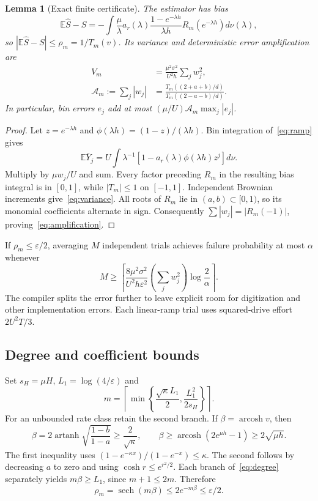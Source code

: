 \documentclass[11pt,a4paper]{article}
\newtheorem{lemma}{Lemma}
\newcommand{\E}{\mathbb E}
\begin{document}
\begin{lemma}[Exact finite certificate]\label{lem:certificate}
The estimator has bias
\begin{equation}\label{eq:bias}
\E\widehat S-S
=-\int\frac{\mu}{\lambda}a_r(\lambda)
\frac{1-e^{-\lambda h}}{\lambda h}
R_m(e^{-\lambda h})d\nu(\lambda),
\end{equation}
so $|\E\widehat S-S|\leq\rho_m=1/T_m(v)$. Its variance and deterministic error amplification are
\begin{align}
V_m&=\frac{\mu^2\sigma^2}{U^2h}\sum_jw_j^2,\label{eq:variance}\\
\mathcal A_m:=\sum_j|w_j|
&=\frac{T_m((2+a+b)/d)}{T_m((2-a-b)/d)}.\label{eq:amplification}
\end{align}
In particular, bin errors $e_j$ add at most $(\mu/U)\mathcal A_m\max_j|e_j|$.
\end{lemma}
\begin{proof}
Let $z=e^{-\lambda h}$ and $\phi(\lambda h)=(1-z)/(\lambda h)$. Bin integration of~\eqref{eq:ramp} gives
\[
\E\bar Y_j=U\int\lambda^{-1}[1-a_r(\lambda)\phi(\lambda h)z^j]d\nu.
\]
Multiply by $\mu w_j/U$ and sum. Every factor preceding $R_m$ in the resulting bias integral is in $[0,1]$, while $|T_m|\leq1$ on $[-1,1]$. Independent Brownian increments give~\eqref{eq:variance}. All roots of $R_m$ lie in $(a,b)\subset[0,1)$, so its monomial coefficients alternate in sign. Consequently $\sum|w_j|=|R_m(-1)|$, proving~\eqref{eq:amplification}.
\end{proof}

If $\rho_m\leq\varepsilon/2$, averaging $M$ independent trials achieves failure probability at most $\alpha$ whenever
\begin{equation}\label{eq:repetitions}
M\geq\left\lceil\frac{8\mu^2\sigma^2}{U^2h\varepsilon^2}
\left(\sum_jw_j^2\right)\log\frac2\alpha\right\rceil.
\end{equation}
The compiler splits the error further to leave explicit room for digitization and other implementation errors. Each linear-ramp trial uses squared-drive effort $2U^2T/3$.

\subsection{Degree and coefficient bounds}

Set $s_H=\mu H$, $L_1=\log(4/\varepsilon)$ and
\begin{equation}\label{eq:degree}
m=\left\lceil\min\left\{\frac{\sqrt\kappa L_1}{2},
\frac{L_1^2}{2s_H}\right\}\right\rceil.
\end{equation}
For an unbounded rate class retain the second branch. If $\beta=\operatorname{arcosh}v$, then
\[
\beta=2\operatorname{artanh}\sqrt{\frac{1-b}{1-a}}
\geq\frac2{\sqrt\kappa},\qquad
\beta\geq\operatorname{arcosh}(2e^{\mu h}-1)\geq2\sqrt{\mu h}.
\]
The first inequality uses $(1-e^{-\kappa x})/(1-e^{-x})\leq\kappa$. The second follows by decreasing $a$ to zero and using $\cosh r\leq e^{r^2/2}$. Each branch of~\eqref{eq:degree} separately yields $m\beta\geq L_1$, since $m+1\leq2m$. Therefore
\[
\rho_m=\operatorname{sech}(m\beta)\leq2e^{-m\beta}\leq\varepsilon/2.
\]
\end{document}
